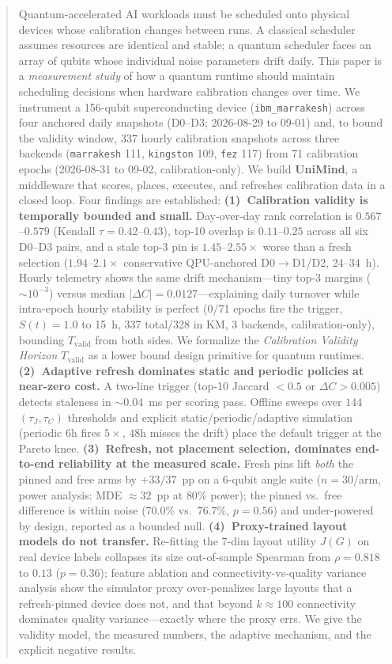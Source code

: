 \documentclass[journal,10pt,twocolumn]{IEEEtran}
\begin{document}
\begin{abstract}
Quantum-accelerated AI workloads must be scheduled onto physical devices whose calibration changes
between runs. A classical scheduler assumes resources are identical and stable; a quantum scheduler
faces an array of qubits whose individual noise parameters drift daily. This paper is a
\emph{measurement study} of how a quantum runtime should maintain scheduling decisions when hardware
calibration changes over time. We instrument a 156-qubit superconducting device
(\texttt{ibm\_marrakesh}) across four anchored daily snapshots (D0--D3; 2026-08-29 to 09-01) and,
to bound the validity window, 337 hourly calibration snapshots across three backends
(\texttt{marrakesh} 111, \texttt{kingston} 109, \texttt{fez} 117) from 71 calibration epochs
(2026-08-31 to 09-02, calibration-only). We build \textbf{UniMind}, a middleware that scores, places, executes, and refreshes calibration
data in a closed loop. Four findings are established:
\textbf{(1)~Calibration validity is temporally bounded and small.} Day-over-day rank correlation is
$0.567$--$0.579$ (Kendall $\tau{=}0.42$--$0.43$), top-10 overlap is $0.11$--$0.25$ across all six
D0--D3 pairs, and a stale top-3 pin is $1.45$--$2.55\times$ worse than a fresh selection
($1.94$--$2.1\times$ conservative QPU-anchored D0$\to$D1/D2, 24--34~h). Hourly telemetry shows the same drift
mechanism---tiny top-3 margins ($\sim10^{-3}$) versus median $|\Delta C|=0.0127$---explaining daily
turnover while intra-epoch hourly stability is perfect (0/71 epochs fire the trigger, $S(t){=}1.0$ to 15~h,
337 total/328 in KM, 3 backends, calibration-only), bounding $T_{\mathrm{valid}}$ from both sides.
We formalize the \emph{Calibration Validity Horizon}
$T_{\mathrm{valid}}$ as a lower bound design primitive for quantum runtimes.
\textbf{(2)~Adaptive refresh dominates static and periodic policies at near-zero cost.} A two-line
trigger (top-10 Jaccard $<0.5$ or $\Delta C{>}0.005$) detects staleness in $\sim0.04$~ms per
scoring pass. Offline sweeps over $144$ $(\tau_J,\tau_C)$ thresholds and explicit
static/periodic/adaptive simulation (periodic $6$h fires $5\times$, $48$h misses the drift)
place the default trigger at the Pareto knee.
\textbf{(3)~Refresh, not placement selection, dominates end-to-end reliability at the measured scale.}
Fresh pins lift \emph{both} the pinned and free arms by $+33/37$~pp on a 6-qubit angle suite
($n=30$/arm, power analysis: MDE $\approx32$~pp at $80\%$ power); the pinned vs.\ free difference
is within noise ($70.0\%$ vs.\ $76.7\%$, $p{=}0.56$) and under-powered by design, reported as a bounded
null.
\textbf{(4)~Proxy-trained layout models do not transfer.} Re-fitting the 7-dim layout utility $J(G)$
on real device labels collapses its size out-of-sample Spearman from $\rho{=}0.818$ to $0.13$
($p{=}0.36$); feature ablation and connectivity-vs-quality variance analysis show the simulator
proxy over-penalizes large layouts that a refresh-pinned device does not, and that beyond
$k\approx100$ connectivity dominates quality variance---exactly where the proxy errs.
We give the validity model, the measured numbers, the adaptive mechanism, and the explicit negative results.
\end{abstract}
\end{document}
